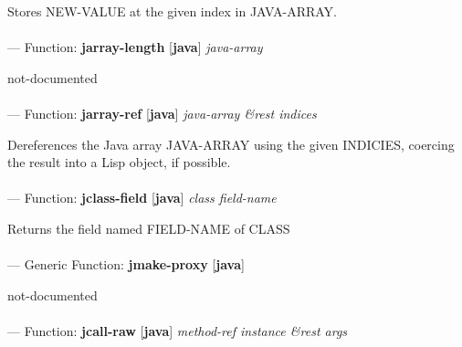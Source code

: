 \begin{adjustwidth}{5em}{5em}
Stores NEW-VALUE at the given index in JAVA-ARRAY.
\end{adjustwidth}

\paragraph{}
\label{JAVA:JARRAY-LENGTH}
--- Function: \textbf{jarray-length} [\textbf{java}] \textit{java-array}

\begin{adjustwidth}{5em}{5em}
not-documented
\end{adjustwidth}

\paragraph{}
\label{JAVA:JARRAY-REF}
--- Function: \textbf{jarray-ref} [\textbf{java}] \textit{java-array \&rest indices}

\begin{adjustwidth}{5em}{5em}
Dereferences the Java array JAVA-ARRAY using the given INDICIES, coercing the result into a Lisp object, if possible.
\end{adjustwidth}

\paragraph{}
\label{JAVA:JCLASS-FIELD}
--- Function: \textbf{jclass-field} [\textbf{java}] \textit{class field-name}

\begin{adjustwidth}{5em}{5em}
Returns the field named FIELD-NAME of CLASS
\end{adjustwidth}

\paragraph{}
\label{JAVA:JMAKE-PROXY}
--- Generic Function: \textbf{jmake-proxy} [\textbf{java}] \textit{}

\begin{adjustwidth}{5em}{5em}
not-documented
\end{adjustwidth}

\paragraph{}
\label{JAVA:JCALL-RAW}
--- Function: \textbf{jcall-raw} [\textbf{java}] \textit{method-ref instance \&rest args}

